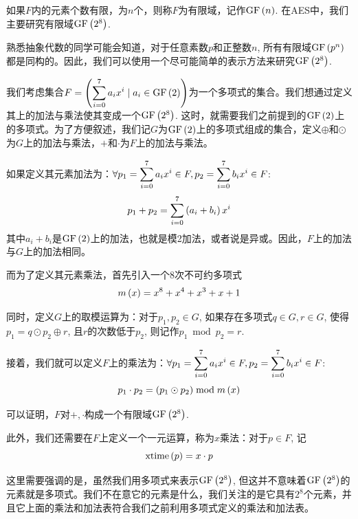 如果$F$内的元素个数有限，为$n$个，则称$F$为有限域，记作$\mathrm{GF}\left( {n}\right)$. 在AES中，我们主要研究有限域$\mathrm{GF}\left( {2^8}\right)$.\par
熟悉抽象代数的同学可能会知道，对于任意素数$p$和正整数$n$, 所有有限域$\mathrm{GF}\left( {p^n}\right)$都是同构的。因此，我们可以使用一个尽可能简单的表示方法来研究$\mathrm{GF}\left( {2^8}\right)$.\par
我们考虑集合$\displaystyle F=\left( {\sum_{i=0}^7a_ix^i\mid a_i\in\mathrm{GF}\left( {2}\right)}\right)$为一个多项式的集合。我们想通过定义其上的加法与乘法使其变成一个$\mathrm{GF}\left( {2^8}\right)$. 这时，就需要我们之前提到的$\mathrm{GF}\left( {2}\right)$上的多项式。为了方便叙述，我们记$G$为$\mathrm{GF}\left( {2}\right)$上的多项式组成的集合，定义$\oplus$和$\odot$为$G$上的加法与乘法，$+$和$\cdot$为$F$上的加法与乘法。\par
如果定义其元素加法为：$\displaystyle\forall p_1=\sum_{i=0}^7a_ix^i\in F, p_2=\sum_{i=0}^7b_ix^i\in F$:
\begin{equation}
p_1+p_2=\sum_{i=0}^7\left( {a_i+b_i}\right)x^i
\end{equation}
其中$a_i+b_i$是$\mathrm{GF}\left( {2}\right)$上的加法，也就是模2加法，或者说是异或。因此，$F$上的加法与$G$上的加法相同。\par
而为了定义其元素乘法，首先引入一个8次不可约多项式
\begin{equation}
m\left( {x}\right)=x^8+x^4+x^3+x+1
\end{equation}

同时，定义$G$上的取模运算为：对于$p_1, p_2\in G$, 如果存在多项式$q\in G, r\in G$, 使得$p_1=q\odot p_2\oplus r$, 且$r$的次数低于$p_2$, 则记作$p_1\bmod{p_2}=r$.\par
接着，我们就可以定义$F$上的乘法为：$\displaystyle\forall p_1=\sum_{i=0}^7a_ix^i\in F, p_2=\sum_{i=0}^7b_ix^i\in F$:
\begin{equation}
p_1\cdot p_2= \left( {p_1\odot p_2}\right)\bmod{m\left( {x}\right)}
\end{equation}

可以证明，$F$对$+, \cdot$构成一个有限域$\mathrm{GF}\left( {2^8}\right)$.\par
此外，我们还需要在$F$上定义一个一元运算，称为$x$乘法：对于$p\in F$, 记
\begin{equation}
\mathrm{xtime}\left( {p}\right)=x\cdot p
\end{equation}

这里需要强调的是，虽然我们用多项式来表示$\mathrm{GF}\left( {2^8}\right)$, 但这并不意味着$\mathrm{GF}\left( {2^8}\right)$的元素就是多项式。我们不在意它的元素是什么，我们关注的是它具有$2^8$个元素，并且它上面的乘法和加法表符合我们之前利用多项式定义的乘法和加法表。
